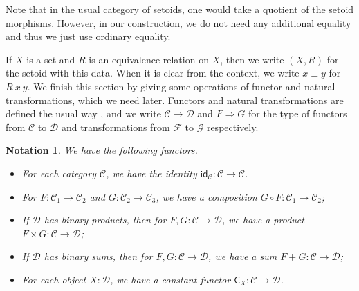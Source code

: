 \documentclass[9pt]{entcs}
\newtheorem{notation}[thm]{Notation}
\newcommand{\functortxt}[1]{\mathsf{#1}}
\newcommand{\0}{\textbf{0}} %
\newcommand{\functor}[2]{#1 \longrightarrow #2} %
\newcommand{\idf}[1]{\functortxt{id}_{#1}} %
\newcommand{\Cf}[1]{\functortxt{C}_{#1}} %
\newcommand{\compf}[2]{#2 \circ #1} %
\newcommand{\prodf}[2]{#1 \times #2} %
\newcommand{\sumf}[2]{#1 + #2} %
\newcommand{\nattrans}[2]{#1 \Longrightarrow #2} %
\begin{document}
Note that in the usual category of setoids, one would take a quotient of the setoid morphisms.
However, in our construction, we do not need any additional equality and thus we just use ordinary equality.

If $X$ is a set and $R$ is an equivalence relation on $X$, then we write $(X, R)$ for the setoid with this data.
When it is clear from the context, we write $x \equiv y$ for $R \> x \> y$.
We finish this section by giving some operations of functor and natural transformations, which we need later.
Functors and natural transformations are defined the usual way \cite{mac2013categories}, and we write $\functor{\mathcal{C}}{\mathcal{D}}$ and $\nattrans{F}{G}$ for the type of functors from $\mathcal{C}$ to $\mathcal{D}$ and transformations from $\mathcal{F}$ to $\mathcal{G}$ respectively.

\begin{notation}
\label{def:functor}
We have the following functors.
\begin{itemize}
	\item For each category $\mathcal{C}$, we have the identity $\idf{\mathcal{C}} : \functor{\mathcal{C}}{\mathcal{C}}$.
	\item For $F : \functor{\mathcal{C}_1}{\mathcal{C}_2}$ and $G : \functor{\mathcal{C}_2}{\mathcal{C}_3}$, we have a composition $\compf{F}{G} : \functor{\mathcal{C}_1}{\mathcal{C}_2}$;
	\item If $\mathcal{D}$ has binary products, then for $F, G : \functor{\mathcal{C}}{\mathcal{D}}$, we have a product $\prodf{F}{G} : \functor{\mathcal{C}}{\mathcal{D}}$;
	\item If $\mathcal{D}$ has binary sums, then for $F, G : \functor{\mathcal{C}}{\mathcal{D}}$, we have a sum $\sumf{F}{G} : \functor{\mathcal{C}}{\mathcal{D}}$;
	\item For each object $X : \mathcal{D}$, we have a constant functor $\Cf{X} : \functor{\mathcal{C}}{\mathcal{D}}$.
\end{itemize}
\end{notation}
\end{document}

